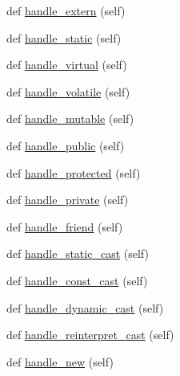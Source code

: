 \begin{DoxyCompactItemize}
\item 
def \mbox{\hyperlink{classscripts_1_1generator_1_1cpp_1_1ast_1_1_ast_builder_a6f85fd4aa4e69828e219b45b4168d022}{handle\+\_\+extern}} (self)
\item 
def \mbox{\hyperlink{classscripts_1_1generator_1_1cpp_1_1ast_1_1_ast_builder_aac4a217300a8d3bfa158873cd9e53ebf}{handle\+\_\+static}} (self)
\item 
def \mbox{\hyperlink{classscripts_1_1generator_1_1cpp_1_1ast_1_1_ast_builder_ace7baff041ca2a2c2d45dff46dd24fb5}{handle\+\_\+virtual}} (self)
\item 
def \mbox{\hyperlink{classscripts_1_1generator_1_1cpp_1_1ast_1_1_ast_builder_ac27b8cbf98734f6d0d53dc350b6e1148}{handle\+\_\+volatile}} (self)
\item 
def \mbox{\hyperlink{classscripts_1_1generator_1_1cpp_1_1ast_1_1_ast_builder_a1902afbfc2d7639a5bc000d814508d70}{handle\+\_\+mutable}} (self)
\item 
def \mbox{\hyperlink{classscripts_1_1generator_1_1cpp_1_1ast_1_1_ast_builder_af6ae207ef7946f32e4e52d4ed68ae7fa}{handle\+\_\+public}} (self)
\item 
def \mbox{\hyperlink{classscripts_1_1generator_1_1cpp_1_1ast_1_1_ast_builder_a5e1e5cfc4376d55597644915e3af1a07}{handle\+\_\+protected}} (self)
\item 
def \mbox{\hyperlink{classscripts_1_1generator_1_1cpp_1_1ast_1_1_ast_builder_a96ba901b114e70382351ffdd63f17f09}{handle\+\_\+private}} (self)
\item 
def \mbox{\hyperlink{classscripts_1_1generator_1_1cpp_1_1ast_1_1_ast_builder_a76965a90e93b94fecea764f55224eae3}{handle\+\_\+friend}} (self)
\item 
def \mbox{\hyperlink{classscripts_1_1generator_1_1cpp_1_1ast_1_1_ast_builder_a1d53fd2d2e5d71a238654054d41dc406}{handle\+\_\+static\+\_\+cast}} (self)
\item 
def \mbox{\hyperlink{classscripts_1_1generator_1_1cpp_1_1ast_1_1_ast_builder_a0140cdb8c4f5dfb1dbbfe19636700f73}{handle\+\_\+const\+\_\+cast}} (self)
\item 
def \mbox{\hyperlink{classscripts_1_1generator_1_1cpp_1_1ast_1_1_ast_builder_a1a55be2b8204a3427d9e539b03c4c680}{handle\+\_\+dynamic\+\_\+cast}} (self)
\item 
def \mbox{\hyperlink{classscripts_1_1generator_1_1cpp_1_1ast_1_1_ast_builder_ab221b5aba3ae1fb5253f3e6286420645}{handle\+\_\+reinterpret\+\_\+cast}} (self)
\item 
def \mbox{\hyperlink{classscripts_1_1generator_1_1cpp_1_1ast_1_1_ast_builder_a750eb53a86f59b03e714e431627aeb39}{handle\+\_\+new}} (self)

\end{DoxyCompactItemize}
